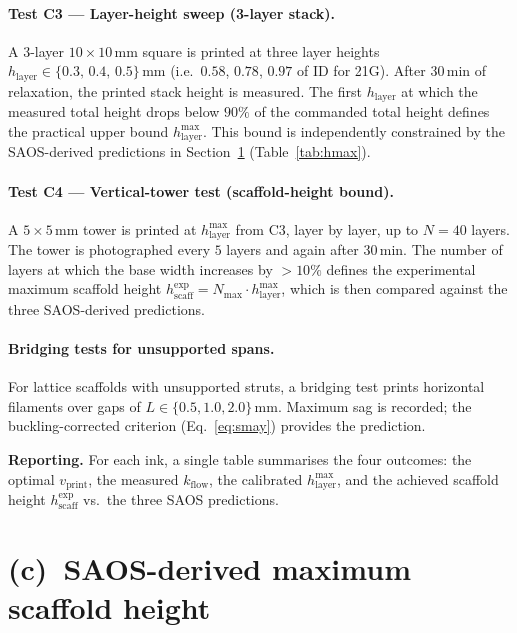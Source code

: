 \documentclass[11pt,a4paper]{article}
\begin{document}
\paragraph{Test C3 --- Layer-height sweep (3-layer stack).}
A $3$-layer $10\times 10\,\mathrm{mm}$ square is printed at three layer heights
$h_\mathrm{layer}\in\{0.3,\,0.4,\,0.5\}\,\mathrm{mm}$ (i.e.\ $0.58$, $0.78$, $0.97$
of ID for 21G). After $30\,\mathrm{min}$ of relaxation, the printed stack height
is measured. The first $h_\mathrm{layer}$ at which the measured total height drops
below $90\%$ of the commanded total height defines the practical upper bound
$h_\mathrm{layer}^\mathrm{max}$. This bound is independently constrained by the
SAOS-derived predictions in Section~\ref{sec:saos_hmax} (Table~\ref{tab:hmax}).

\paragraph{Test C4 --- Vertical-tower test (scaffold-height bound).}
A $5\times 5\,\mathrm{mm}$ tower is printed at $h_\mathrm{layer}^\mathrm{max}$
from C3, layer by layer, up to $N=40$ layers. The tower is photographed every
$5$ layers and again after $30\,\mathrm{min}$. The number of layers at which the
base width increases by $>10\%$ defines the experimental maximum scaffold height
$h_\mathrm{scaff}^\mathrm{exp} = N_\mathrm{max}\cdot h_\mathrm{layer}^\mathrm{max}$,
which is then compared against the three SAOS-derived predictions.

\paragraph{Bridging tests for unsupported spans.}
For lattice scaffolds with unsupported struts, a bridging test prints horizontal
filaments over gaps of $L\in\{0.5,1.0,2.0\}\,\mathrm{mm}$. Maximum sag is
recorded; the buckling-corrected criterion (Eq.~\ref{eq:smay}) provides the
prediction.

\noindent\textbf{Reporting.} For each ink, a single table summarises the four
outcomes: the optimal $v_\mathrm{print}$, the measured $k_\mathrm{flow}$, the
calibrated $h_\mathrm{layer}^\mathrm{max}$, and the achieved scaffold height
$h_\mathrm{scaff}^\mathrm{exp}$ vs.\ the three SAOS predictions.

\section{(c)~SAOS-derived maximum scaffold height}
\label{sec:saos_hmax}
\end{document}
